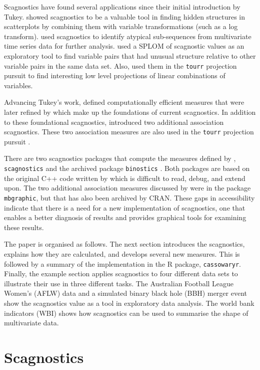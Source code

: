 Scagnostics have found several applications since their initial introduction by Tukey. \citet{hidscags} showed scagnostics to be a valuable tool in finding hidden structures in scatterplots by combining them with variable transformations (such as a log transform). \citet{timeseer} used scagnostics to identify atypical sub-sequences from multivariate time series data for further analysis. \citet{scagdist} used a SPLOM of scagnostic values as an exploratory tool to find variable pairs that had unusual structure relative to other variable pairs in the same data set. Also, \citet{tourrpp} used them in the \texttt{tourr} projection pursuit to find interesting low level projections of linear combinations of variables.

Advancing Tukey's work, \citet{scag} defined computationally efficient measures that were later refined by \citet{scagdist} which make up the foundations of current scagnostics. In addition to these foundational scagnostics, \citet{Grimm} introduced two additional association scagnostics. These two association measures are also used in the \texttt{tourr} projection pursuit \citep{tourrpp}.

There are two scagnostics packages that compute the measures defined by \citet{scag}, \texttt{scagnostics} \citep{scagdist} and the archived package \texttt{binostics} \citep{binostics}. Both packages are based on the original C++ code written by \citet{scagdist} which is difficult to read, debug, and extend upon. The two additional association measures discussed by \citet{Grimm} were in the package \texttt{mbgraphic}, but that has also been archived by CRAN. These gaps in accessibility indicate that there is a need for a new implementation of scagnostics, one that enables a better diagnosis of results and provides graphical tools for examining these results.

The paper is organised as follows. The next section introduces the scagnostics, explains how they are calculated, and develops several new measures. This is followed by a summary of the implementation in the R package, \texttt{cassowaryr}. Finally, the example section applies scagnostics to four different data sets to illustrate their use in three different tasks. The Australian Football League Women's (AFLW) data and a simulated binary black hole (BBH) merger event show the scagnostics value as a tool in exploratory data analysis. The world bank indicators (WBI) shows how scagnostics can be used to summarise the shape of multivariate data.

\section{Scagnostics}\label{scagnostics}


